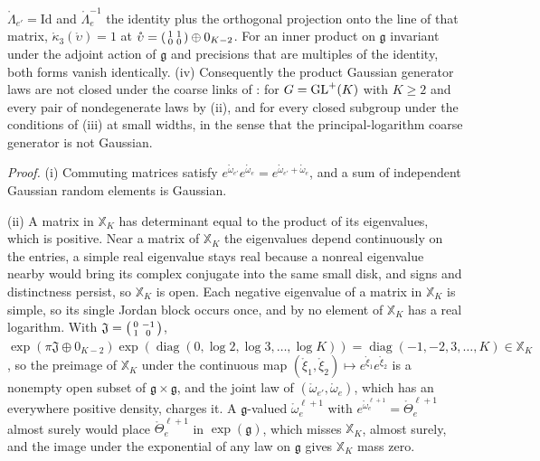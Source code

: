 \(\mathring\Lambda_{e'}=\mathrm{Id}\) and \(\mathring\Lambda_e^{-1}\) the identity plus the orthogonal
projection onto the line of that matrix, \(\mathring\kappa_3(\mathring\upsilon)=1\) at
\(\mathring\upsilon=\begin{psmallmatrix}1&1\\0&0\end{psmallmatrix}\oplus0_{K-2}\). For an inner product on
\(\mathfrak g\) invariant under the adjoint action of \(\mathfrak g\) and precisions that are multiples of
the identity, both forms vanish identically.
(iv) Consequently the product Gaussian generator laws are not closed under the coarse links of
: for \(G=\mathrm{GL}^+(K)\) with \(K\geq2\) and every pair of nondegenerate laws
by (ii), and for every closed subgroup under the conditions of (iii) at small widths, in the sense that
the principal-logarithm coarse generator is not Gaussian. 

\noindent\emph{Proof.}
(i) Commuting matrices satisfy \(e^{\mathring\omega_{e'}}e^{\mathring\omega_e}=e^{\mathring\omega_{e'}+\mathring\omega_e}\),
and a sum of independent Gaussian random elements is Gaussian.

(ii) A matrix in \(\mathbb X_K\) has determinant equal to the product of its eigenvalues, which is
positive. Near a matrix of \(\mathbb X_K\) the eigenvalues depend continuously on the entries, a simple
real eigenvalue stays real because a nonreal eigenvalue nearby would bring its complex conjugate into the
same small disk, and signs and distinctness persist, so \(\mathbb X_K\) is open. Each negative eigenvalue of a
matrix in \(\mathbb X_K\) is simple, so its single Jordan block occurs once, and by
\citet[Theorem~1]{culver1966existence} no element of \(\mathbb X_K\) has a real logarithm. With
\(\mathfrak J=\begin{psmallmatrix}0&-1\\1&0\end{psmallmatrix}\),
\(\exp(\pi\mathfrak J\oplus0_{K-2})\exp(\operatorname{diag}(0,\log2,\log3,\ldots,\log K))=\operatorname{diag}(-1,-2,3,\ldots,K)\in\mathbb X_K\),
so the preimage of \(\mathbb X_K\) under the continuous map
\((\mathring\xi_1,\mathring\xi_2)\mapsto e^{\mathring\xi_1}e^{\mathring\xi_2}\) is a nonempty open subset of
\(\mathfrak g\times\mathfrak g\), and the joint law of \((\mathring\omega_{e'},\mathring\omega_e)\), which has an
everywhere positive density, charges it. A \(\mathfrak g\)-valued \(\mathring\omega^{\ell+1}_e\) with
\(e^{\mathring\omega^{\ell+1}_e}=\mathring\Theta^{\ell+1}_e\) almost surely would place
\(\mathring\Theta^{\ell+1}_e\) in \(\exp(\mathfrak g)\), which misses \(\mathbb X_K\), almost surely, and the
image under the exponential of any law on \(\mathfrak g\) gives \(\mathbb X_K\) mass zero.

